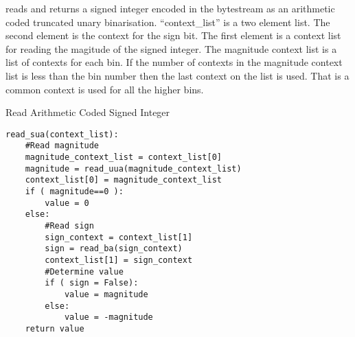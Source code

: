 \begin{comment}
Signed unary arithmetic decoding su\_arith\_decode() has the following
pseudocode representation:

VALUE= uu\_arith\_decode()

if ( VALUE!=0 )

{

    if ( !binary\_arith\_decode( choose\_context() ) )

    VALUE=-VALUE

}

\end{comment}


reads and returns a signed integer encoded in the bytestream as an
arithmetic coded truncated unary binarisation.  ``context\_list'' is a two
element list. The second element is the context for the sign bit. The
first element is a  context list for reading the magitude of the signed
integer.  The magnitude context list is a list of contexts for each bin.
If the number of contexts in the magnitude context list is less than the
bin number then the last context on the list is used. That is a common
context is used for all the higher bins.

Read Arithmetic Coded Signed Integer
\begin{verbatim}
read_sua(context_list):
    #Read magnitude
    magnitude_context_list = context_list[0]
    magnitude = read_uua(magnitude_context_list)
    context_list[0] = magnitude_context_list
    if ( magnitude==0 ):
        value = 0
    else:
        #Read sign
        sign_context = context_list[1]
        sign = read_ba(sign_context)
        context_list[1] = sign_context
        #Determine value
        if ( sign = False):
            value = magnitude
        else:
            value = -magnitude
    return value
\end{verbatim}
